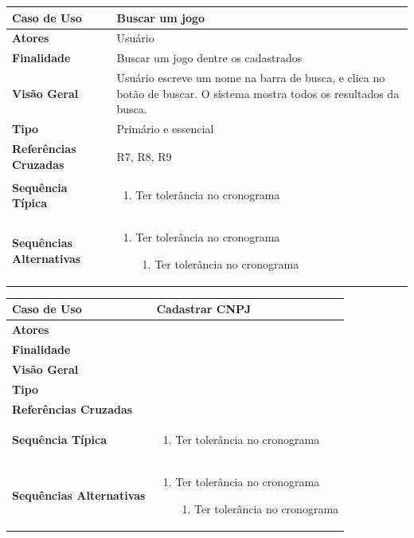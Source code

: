 \documentclass[a4paper,11pt]{article}
\begin{document}
\begin{table}[H]
		\begin{tabularx}{\textwidth}{|l|X|}
		\hline
			\textbf{Caso de Uso} &  Buscar um jogo \\ \hline
			\textbf{Atores} &  Usuário  \\ \hline
			\textbf{Finalidade} &   Buscar um jogo dentre os cadastrados  \\ \hline
			\textbf{Visão Geral} &  Usuário escreve um nome na barra de busca, e clica no botão
de buscar. O sistema mostra todos os resultados da busca.  \\ \hline
			\textbf{Tipo} &   Primário e essencial \\ \hline
			\textbf{Referências Cruzadas} &   R7, R8, R9 \\ \hline
			\textbf{Sequência Típica} & 
			\begin{enumerate}
			\item Ter tolerância no cronograma
			\end{enumerate} \\ \hline
			\textbf{Sequências Alternativas} & 
			\begin{enumerate}
			\item Ter tolerância no cronograma
			\begin{enumerate}
			\item Ter tolerância no cronograma
			\end{enumerate}
			\end{enumerate} \\ \hline
		\end{tabularx}
\end{table}

\begin{table}[H]
		\begin{tabularx}{\textwidth}{|l|X|}
		\hline
			\textbf{Caso de Uso} &  Cadastrar CNPJ \\ \hline
			\textbf{Atores} &    \\ \hline
			\textbf{Finalidade} &   \\ \hline
			\textbf{Visão Geral} &  \\ \hline
			\textbf{Tipo} &  \\ \hline
			\textbf{Referências Cruzadas} &  \\ \hline
			\textbf{Sequência Típica} & 
			\begin{enumerate}
			\item Ter tolerância no cronograma
			\end{enumerate} \\ \hline
			\textbf{Sequências Alternativas} & 
			\begin{enumerate}
			\item Ter tolerância no cronograma
			\begin{enumerate}
			\item Ter tolerância no cronograma
			\end{enumerate}
			\end{enumerate} \\ \hline
		\end{tabularx}
\end{table}
\end{document}

